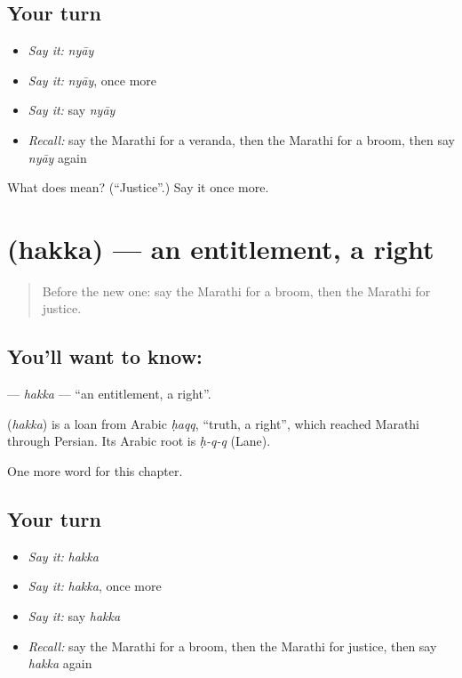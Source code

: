 \subsection*{Your turn}
\begin{itemize}
\raggedright
  \item \emph{Say it:} \emph{nyāy}
  \item \emph{Say it:} \emph{nyāy}, once more
  \item \emph{Say it:} say \emph{nyāy}
  \item \emph{Recall:} say the Marathi for a veranda, then the Marathi for a broom, then say \emph{nyāy} again
\end{itemize}

\begin{tcolorbox}[breakable,colback=teal!4,colframe=teal!35!black,title={Before you move on}]
What does  mean? (\textquotedblleft{}Justice\textquotedblright{}.) Say it once more.
\end{tcolorbox}
\section[\texorpdfstring{\mr{हक्क} (hakka)}{हक्क (hakka)}]{ (hakka) — an entitlement, a right}

\label{lesson:MR-C272-hakka}



\begin{quote}
Before the new one: say the Marathi for a broom, then the Marathi for justice.
\end{quote}

\subsection*{You'll want to know: }
\textbf{} — \emph{hakka} — \textquotedblleft{}an entitlement, a right\textquotedblright{}.

\begin{cousinweb}
\textbf{} (\emph{hakka}) is a loan from Arabic \emph{ḥaqq}, \textquotedblleft{}truth, a right\textquotedblright{}, which reached Marathi through Persian. Its Arabic root is \emph{ḥ-q-q} (Lane).
\end{cousinweb}

\begin{grammarlens}[title={What you've built}]
One more word for this chapter.
\end{grammarlens}

\subsection*{Your turn}
\begin{itemize}
\raggedright
  \item \emph{Say it:} \emph{hakka}
  \item \emph{Say it:} \emph{hakka}, once more
  \item \emph{Say it:} say \emph{hakka}
  \item \emph{Recall:} say the Marathi for a broom, then the Marathi for justice, then say \emph{hakka} again
\end{itemize}

